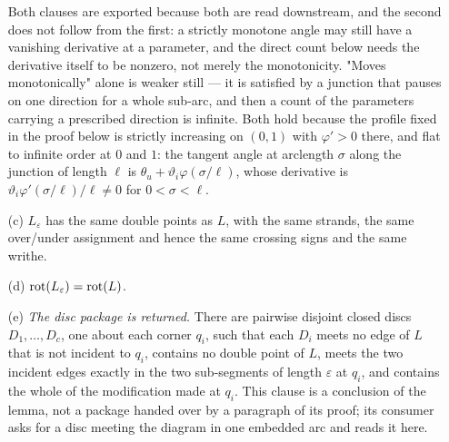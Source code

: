 \begin{lemma}[rounding]
\begin{enumerate}
Both clauses are exported because both are read downstream, and the second does
not follow from the first: a strictly monotone angle may still have a vanishing
derivative at a parameter, and the direct count below needs the derivative
itself to be nonzero, not merely the monotonicity. "Moves monotonically" alone
is weaker still --- it is
satisfied by a junction that pauses on one direction for a whole sub-arc, and
then a count of the parameters carrying a prescribed direction is infinite. Both
hold because the profile fixed in the proof below is strictly increasing on
$(0,1)$ with $\varphi'>0$ there, and flat to infinite order at $0$ and $1$: the
tangent angle at arclength $\sigma$ along the junction of length $\ell$ is
$\theta_u+\vartheta_i\varphi(\sigma/\ell)$, whose derivative is
$\vartheta_i\varphi'(\sigma/\ell)/\ell\neq0$ for $0<\sigma<\ell$.
\item[(c)] $L_\varepsilon$ has the same double points as $L$, with the same
strands, the same over/under assignment and hence the same crossing signs and
the same writhe.
\item[(d)] $\operatorname{rot}(L_\varepsilon)=\operatorname{rot}(L)$.
\item[(e)] \emph{The disc package is returned.} There are pairwise disjoint
closed discs $D_1,\dots,D_c$, one about each corner $q_i$, such that each $D_i$
meets no edge of $L$ that is not incident to $q_i$, contains no double point of
$L$, meets the two incident edges exactly in the two sub-segments of length
$\varepsilon$ at $q_i$, and contains the whole of the modification made at
$q_i$. This clause is a conclusion of the lemma, not a package handed over by a
paragraph of its proof; its consumer asks for a disc meeting the diagram in one
embedded arc and reads it here.
\end{enumerate}
\end{lemma}
